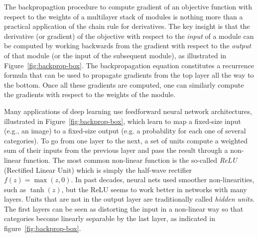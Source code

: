 \documentclass[10pts]{article}
\newcommand{\deri}[2]{\frac{\partial  #1}{\partial #2}}
\begin{document}
The backpropagtion procedure to compute gradient of an objective
function with respect to the weights of a multilayer stack of modules
is nothing more than a practical application of the chain rule for
derivatives. The key insight is that the derivative (or gradient) of
the objective with respect to the {\it input} of a module can be
computed by working backwards from the gradient with respect to the
{\em output} of that module (or the input of the subsequent
module), as illustrated in Figure~\ref{fig:backprop-box}.
The backpropagation equation
constitutes a recurrence formula that can be used to propagate
gradients from the top layer all the way to the bottom. Once all these
gradients are computed, one can similarly compute the gradients with
respect to the weights of the module. 


Many applications of deep learning use feedforward neural network
architectures, illustrated in Figure~\ref{fig:backprop-box}, which
learn to map a fixed-size input (e.g., an image) to a fixed-size
output (e.g. a probability for each one of several categories). To go
from one layer to the next, a set of units compute a weighted
sum of their inputs from the previous layer and pass the result
through a non-linear function. The most common non-linear function is
the so-called {\em ReLU} (Rectified Linear Unit) which is simply the
half-wave rectifier $f(z) = \max(z,0)$. In past decades, neural nets
used smoother non-linearities, such as $\tanh(z)$, but the ReLU seems
to work better in networks with many layers. Units that are not in the
output layer are traditionally called {\em hidden units}. The first
layers can be seen as distorting the input in a non-linear way so that
categories become linearly separable by the last layer, as indicated
in figure~\ref{fig:backprop-box}.
\end{document}

